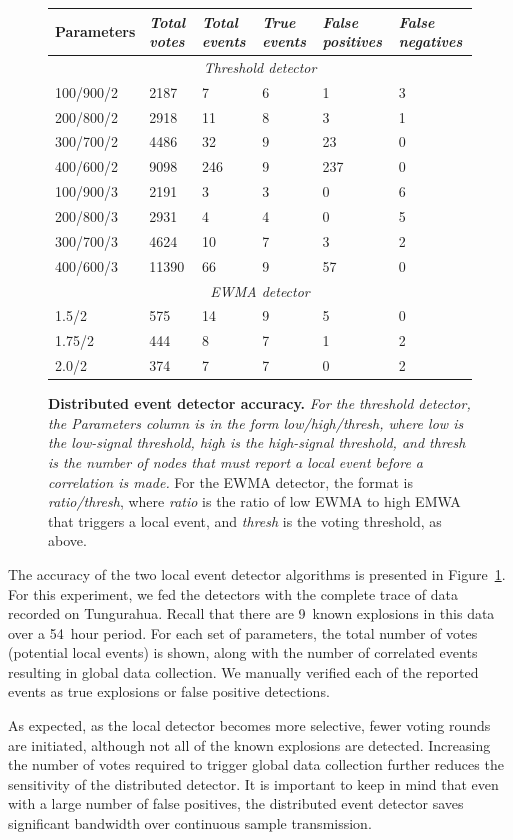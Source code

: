 \begin{figure}[t]
\begin{center}
\begin{tabular}{|llllll|} \hline
{\bf Parameters} & {\em Total votes} & {\em Total events} & {\em True events} & {\em False positives} & {\em False negatives} \\ \hline
\multicolumn{6}{|c|}{\em Threshold detector} \\ 
100/900/2 & 2187 & 7 & 6 & 1 & 3 \\ 
200/800/2 & 2918 & 11 & 8 & 3 & 1 \\ 
300/700/2 & 4486 & 32 & 9 & 23 & 0 \\ 
400/600/2 & 9098 & 246 & 9 & 237 & 0 \\ \hline
100/900/3 & 2191 & 3 & 3 & 0 & 6 \\ 
200/800/3 & 2931 & 4 & 4 & 0 & 5 \\ 
300/700/3 & 4624 & 10 & 7 & 3 & 2 \\ 
400/600/3 & 11390 & 66 & 9 & 57 & 0 \\ \hline
\multicolumn{6}{|c|}{\em EWMA detector} \\ 
1.5/2 & 575 & 14 & 9 & 5 & 0 \\ 
1.75/2 & 444 & 8 & 7 & 1 & 2 \\ 
2.0/2 & 374 & 7 & 7 & 0 & 2 \\ \hline
\end{tabular}
\end{center}
\caption{\small {\bf Distributed event detector accuracy.} 
{\em For the threshold detector, the {\em Parameters} column is 
in the form {\em low/high/thresh},
where {\em low} is the low-signal threshold, {\em high} is the
high-signal threshold, and {\em thresh} is the number of nodes that
must report a local event before a correlation is made.}
For the EWMA detector, the format is {\em ratio/thresh},
where {\em ratio} is the ratio of low EWMA to high EMWA
that triggers a local event, and {\em thresh} is the voting threshold, 
as above.}
\label{fig-dd-accuracy}
\end{figure}

The accuracy of the two local event detector algorithms is presented in
Figure~\ref{fig-dd-accuracy}. For this experiment, we fed the detectors
with the complete trace of data recorded on Tungurahua. Recall that
there are 9~known explosions in this data over a 54~hour period.
For each set of parameters, the total number of votes (potential local
events) is shown, along with the number of correlated events resulting in
global data collection. We manually verified each of the reported events
as true explosions or false positive detections.

As expected, as the local detector becomes more selective, fewer voting
rounds are initiated, although not all of the known explosions are
detected. Increasing the number of votes required to trigger global data
collection further reduces the sensitivity of the distributed detector.
It is important to keep in mind that even with a large number of false
positives, the distributed event detector saves significant bandwidth
over continuous sample transmission.


